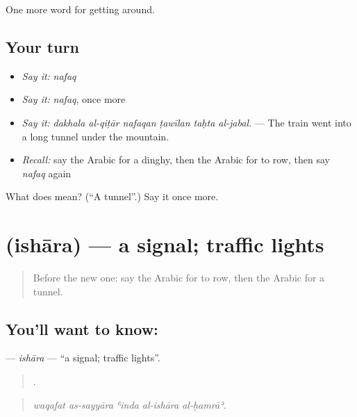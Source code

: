 \begin{grammarlens}[title={What you've built}]
One more word for getting around.
\end{grammarlens}

\subsection*{Your turn}
\begin{itemize}
\raggedright
  \item \emph{Say it:} \emph{nafaq}
  \item \emph{Say it:} \emph{nafaq}, once more
  \item \emph{Say it:} \emph{dakhala al-qiṭār nafaqan ṭawīlan taḥta al-jabal.} — The train went into a long tunnel under the mountain.
  \item \emph{Recall:} say the Arabic for a dinghy, then the Arabic for to row, then say \emph{nafaq} again
\end{itemize}

\begin{tcolorbox}[breakable,colback=teal!4,colframe=teal!35!black,title={Before you move on}]
What does  mean? (\textquotedblleft{}A tunnel\textquotedblright{}.) Say it once more.
\end{tcolorbox}
\section[\texorpdfstring{\ar{إشارة} (ishāra)}{إشارة (ishāra)}]{ (ishāra) — a signal; traffic lights}

\label{lesson:AR-C431-ishara}



\begin{quote}
Before the new one: say the Arabic for to row, then the Arabic for a tunnel.
\end{quote}

\subsection*{You'll want to know: }
\textbf{} — \emph{ishāra} — \textquotedblleft{}a signal; traffic lights\textquotedblright{}.

\begin{quote}
    .
\end{quote}

\begin{quote}
\emph{waqafat as-sayyāra ʿinda al-ishāra al-ḥamrāʾ.}
\end{quote}


